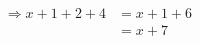 \documentclass[preview]{standalone}
\begin{document}
\begin{align*}
\Rightarrow  x+1+2+4& =x+1+6\\ & = x+7
\end{align*}
\end{document}

